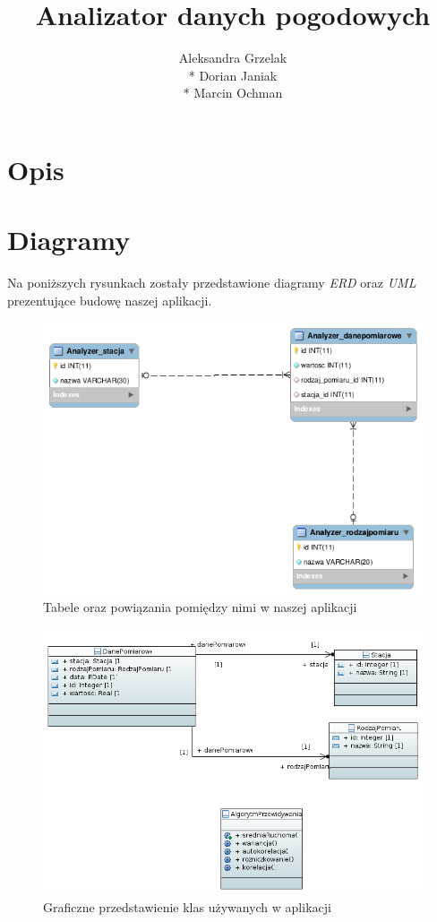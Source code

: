 \documentclass[a4paper]{article}
\author{Aleksandra Grzelak \\* Dorian Janiak \\* Marcin Ochman}
\title{Analizator danych pogodowych}
\begin{document}
\maketitle

\section{Opis}

\section{Diagramy}

Na poniższych rysunkach zostały przedstawione diagramy \textit{ERD} oraz \textit{UML} prezentujące budowę naszej aplikacji.

\begin{figure}[h]
\centering
\includegraphics[scale=0.6]{./diagramEER}
\caption{Tabele oraz powiązania pomiędzy nimi w naszej aplikacji}
\label{fig:diagram_eer}
\end{figure}

\begin{figure}[h]
\centering
\includegraphics[scale=0.7]{./uml}
\caption{Graficzne przedstawienie klas używanych w aplikacji}
\label{fig:diagram_eer}
\end{figure}
\end{document}
